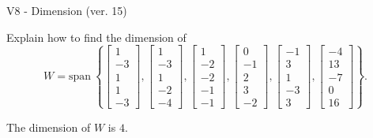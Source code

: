\begin{exercise}
  \begin{exerciseTitle}V8 - Dimension (ver. 15)\end{exerciseTitle}
  \begin{exerciseStatement}
    Explain how to find the dimension of 
\[W=\mathrm{span}\ \left\{\left[\begin{array}{r}
1 \\
-3 \\
1 \\
1 \\
-3
\end{array}\right] , \left[\begin{array}{r}
1 \\
-3 \\
1 \\
-2 \\
-4
\end{array}\right] , \left[\begin{array}{r}
1 \\
-2 \\
-2 \\
-1 \\
-1
\end{array}\right] , \left[\begin{array}{r}
0 \\
-1 \\
2 \\
3 \\
-2
\end{array}\right] , \left[\begin{array}{r}
-1 \\
3 \\
1 \\
-3 \\
3
\end{array}\right] , \left[\begin{array}{r}
-4 \\
13 \\
-7 \\
0 \\
16
\end{array}\right]\right\}.\]



  \end{exerciseStatement}
  \begin{exerciseAnswer}
   The dimension of \(W\) is  \(4\).
  


  \end{exerciseAnswer}
\end{exercise}